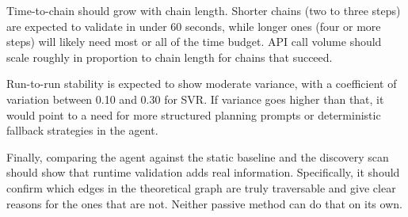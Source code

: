 \documentclass[conference]{IEEEtran}
\begin{document}
Time-to-chain should grow with chain length. Shorter chains (two to three steps) are expected to validate in under 60 seconds, while longer ones (four or more steps) will likely need most or all of the time budget. API call volume should scale roughly in proportion to chain length for chains that succeed.

Run-to-run stability is expected to show moderate variance, with a coefficient of variation between 0.10 and 0.30 for SVR. If variance goes higher than that, it would point to a need for more structured planning prompts or deterministic fallback strategies in the agent.

Finally, comparing the agent against the static baseline and the discovery scan should show that runtime validation adds real information. Specifically, it should confirm which edges in the theoretical graph are truly traversable and give clear reasons for the ones that are not. Neither passive method can do that on its own.



\end{document}
